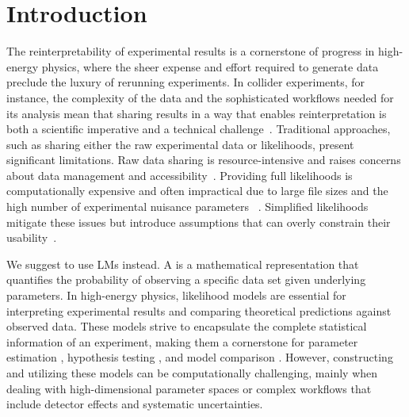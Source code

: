 \documentclass[aps,nofootinbib,superscriptaddress,reprint,preprintnumbers]{revtex4-1}
\begin{document}
\section{Introduction}

The reinterpretability of experimental results is a cornerstone of progress in high-energy physics, where the sheer expense and effort required to generate data preclude the luxury of rerunning experiments.
In collider experiments, for instance, the complexity of the data and the sophisticated workflows needed for its analysis mean that sharing results in a way that enables reinterpretation is both a scientific imperative and a technical challenge~\cite{Alguero:2022gwm, Araz:2021akd, Araz:2020lnp, Conte:2018vmg, Dumont:2014tja, Conte:2014zja, Conte:2012fm, Araz:2023axv, Bierlich:2019rhm, Buckley:2019stt, Buckley:2010ar, Alguero:2021dig, Alguero:2020grj, Ambrogi:2018ujg}.
Traditional approaches, such as sharing either the raw experimental data or likelihoods, present significant limitations. 
Raw data sharing is resource-intensive and raises concerns about data management and accessibility~\cite{opendata, Aidala:2023dai}.
Providing full likelihoods is computationally expensive and often impractical due to large file sizes and the high number of experimental nuisance parameters ~\cite{Heinrich:2021gyp, Cranmer:2012sba}.
Simplified likelihoods mitigate these issues but introduce assumptions that can overly constrain their usability~\cite{Araz:2023bwx}. 

We suggest to use \acp{LM} instead.
A \LM is a mathematical representation that quantifies the probability of observing a specific data set given underlying parameters. In high-energy physics, likelihood models are essential for interpreting experimental results and comparing theoretical predictions against observed data. These models strive to encapsulate the complete statistical information of an experiment, making them a cornerstone for parameter estimation \cite{Flacher:2008zq}, hypothesis testing \cite{Englert:2015hrx,Englert:2017aqb}, and model comparison \cite{Drees:2013wra,Dercks:2016npn,GAMBIT:2017yxo,Amrith:2018yfb}. However, constructing and utilizing these models can be computationally challenging, mainly when dealing with high-dimensional parameter spaces or complex workflows that include detector effects and systematic uncertainties.
\end{document}

